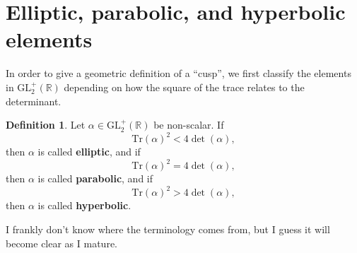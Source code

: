 \documentclass{article}
\theoremstyle{definition}
\newtheorem{defi}{Definition}
\begin{document}
\section{Elliptic, parabolic, and hyperbolic elements}
In order to give a geometric definition of a ``cusp'', we first classify the elements in $\mathrm{GL}_2^+(\mathbb{R})$ depending on how the square of the trace relates to the determinant.
\begin{defi}
Let $\alpha\in\mathrm{GL}_2^+(\mathbb{R})$ be non-scalar. If
\[\mathrm{Tr}(\alpha)^2<4\det(\alpha),\]
then $\alpha$ is called {\bf elliptic}, and if
\[\mathrm{Tr}(\alpha)^2=4\det(\alpha),\]
then $\alpha$ is called {\bf parabolic}, and if
\[\mathrm{Tr}(\alpha)^2>4\det(\alpha),\]
then $\alpha$ is called {\bf hyperbolic}.
\end{defi}
I frankly don't know where the terminology comes from, but I guess it will become clear as I mature.
\end{document}
